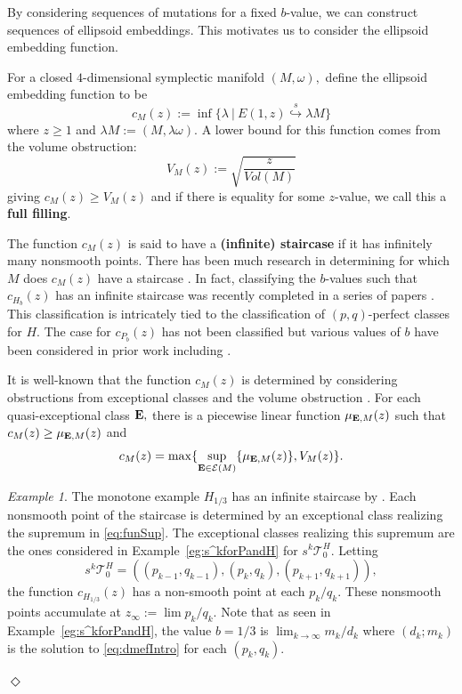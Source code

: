 \documentclass[11pt, reqno]{amsart}
\theoremstyle{remark}
\numberwithin{equation}{subsection}
\numberwithin{figure}{section}
\theoremstyle{customremark}
\newtheorem{example_no_diamond}[thm]{Example}
\newenvironment{example}{\begin{example_no_diamond} } {\hfill$\er$ \end{example_no_diamond}}
\newcommand{\Tt}{\mathcal{T}}
\newcommand{\bE}{{\bf{E}}}
\newcommand{\la}{{\lambda}}
\newcommand{\er}{{\Diamond}}
\newcommand{\sembeds}{\stackrel{s}{\hookrightarrow}}
\begin{document}
By considering sequences of mutations for a fixed $b$-value, we can construct sequences of ellipsoid embeddings. This motivates us to consider the ellipsoid embedding function. 

For a closed $4$-dimensional symplectic manifold $(M,\omega),$ define the ellipsoid embedding function to be 
  \[ c_M(z):=\inf\{ \la \ | \ E(1,z) \sembeds \la M\}\]
  where $z \geq 1$ and $\la M:=(M,\la \omega).$ A lower bound for this function comes from the volume obstruction:
  \[ V_M(z):=\sqrt{\frac{z}{Vol(M)}}\]
  giving $c_M(z) \geq V_M(z)$ and if there is equality for some $z$-value, we call this a {\bf full filling}.

  The function $c_M(z)$ is said to have a {\bf (infinite) staircase} if it has infinitely many nonsmooth points. There has been much research in determining for which $M$ does $c_M(z)$ have a staircase \cite{ball,Usher,ICERM,FM}. In fact, classifying the $b$-values such that $c_{H_b}(z)$ has an infinite staircase was recently completed in a series of papers \cite{ICERM,MM,MMW,MPW}. This classification is intricately tied to the classification of $(p,q)$-perfect classes for $H.$ The case for $c_{P_b}(z)$ has not been classified but various values of $b$ have been considered in prior work including \cite{Usher,REU,FM}. 

It is well-known that the function $c_M(z)$ is determined by considering obstructions from exceptional classes and the volume obstruction \cite{MP,Mell,CG}. For each quasi-exceptional class $\bE,$ there is a piecewise linear function $\mu_{\bE,M}(z)$ such that $c_M(z) \geq \mu_{\bE,M}(z)$ and \begin{equation} \label{eq:funSup} c_M(z)=\max\{\sup_{\bE \in \mathcal{E}(M)}\{\mu_{\bE,M}(z)\},V_M(z)\}.\end{equation} 

\begin{example}
    The monotone example $H_{1/3}$ has an infinite staircase by \cite{AADT}. Each nonsmooth point of the staircase is determined by an exceptional class realizing the supremum in \eqref{eq:funSup}.  The exceptional classes realizing this supremum are the ones considered in Example~\ref{eg:s^kforPandH} for $s^k\Tt_0^H.$ Letting
    \[ s^k\Tt_0^H=((p_{k-1},q_{k-1}),(p_k,q_k),(p_{k+1},q_{k+1})),\]
    the function $c_{H_{1/3}}(z)$ has a non-smooth point at each $p_k/q_k.$ These nonsmooth points accumulate at $z_\infty:=\lim p_k/q_k$. Note that as seen in Example~\ref{eg:s^kforPandH}, the value $b=1/3$ is $\lim_{k \to \infty} m_k/d_k$ where $(d_k;m_k)$ is the solution to \eqref{eq:dmefIntro} for each $(p_k,q_k).$
 
\end{example}
\end{document}
